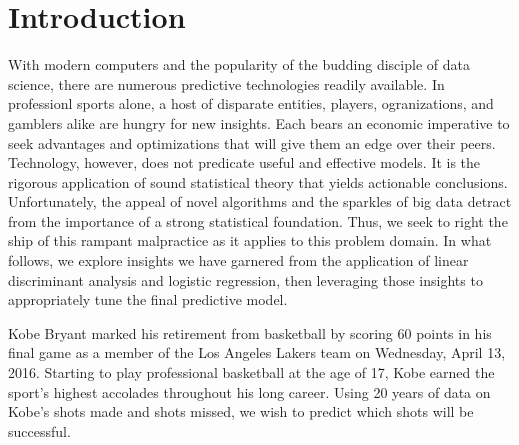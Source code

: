 \chapter{Introduction}\label{chap:introduction}
\par
\indent With modern computers and the popularity of the budding disciple of data science, there are numerous predictive technologies readily available.  In professionl sports alone, a host of disparate entities, players, ogranizations, and gamblers alike are hungry for new insights. Each bears an economic imperative to seek advantages and optimizations that will give them an edge over their peers.  Technology, however, does not predicate useful and effective models.  It is the rigorous application of sound statistical theory that yields actionable conclusions.  Unfortunately, the appeal of novel algorithms and the sparkles of big data detract from the importance of a strong statistical foundation.  Thus, we seek to right the ship of this rampant malpractice as it applies to this problem domain.  In what follows, we explore insights we have garnered from the application of linear discriminant analysis and logistic regression, then leveraging those insights to appropriately tune the final predictive model.
\par
\indent Kobe Bryant marked his retirement from basketball by scoring 60 points in his final game as a member of the Los Angeles Lakers team on Wednesday, April 13, 2016. Starting to play professional basketball at the age of 17, Kobe earned the sport’s highest accolades throughout his long career.  Using 20 years of data on Kobe's shots made and shots missed, we wish to predict which shots will be successful.
